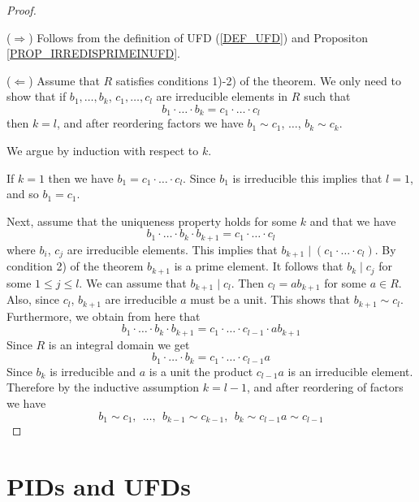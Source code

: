 \documentclass[12pt, letterpaper, oneside]{article}
\theoremstyle{plain}
\theoremstyle{definition}
\newcommand{\vs}{\vskip 5mm}
\begin{document}
\begin{proof}\ 


($\Rightarrow$) Follows from the definition of UFD (\ref{DEF_UFD}) and 
Propositon \ref{PROP_IRREDISPRIMEINUFD}.


\vs

 ($\Leftarrow$) Assume that $R$ satisfies conditions 1)-2) of the theorem. We only need 
 to show that  if $b_{1}, \dots, b_{k}$, $c_{1}, \dots, c_{l}$ are irreducible elements in $R$
 such that 
$$ b_{1}\cdot {\dots} \cdot b_{k} = c_{1}\cdot {\dots} \cdot c_{l}$$
then $k=l$, and after reordering factors   we have 
$b_{1}\sim c_{1}$, $\dots$, $b_{k}\sim c_{k}$.

We argue by induction with respect to $k$. 
 
If $k=1$ then we have  $b_{1}= c_{1}\cdot {\dots} \cdot c_{l}$. Since $b_{1}$ is irreducible 
this implies that $l=1$, and so $b_{1}=c_{1}$.


Next, assume that the uniqueness property holds for some $k$ and that we have 
$$ b_{1}\cdot {\dots} \cdot b_{k}\cdot b_{k+1} = c_{1}\cdot {\dots} \cdot c_{l}$$
where $b_{i}$, $c_{j}$ are irreducible elements. This implies that 
$b_{k+1} \mid (c_{1}\cdot {\dots} \cdot c_{l})$. By condition 2) of the theorem $b_{k+1}$ 
is a prime element. It follows that $b_{k}\mid c_{j}$ for some $1\leq j\leq l$. We can assume that 
$b_{k+1}\mid c_{l}$. Then $c_{l} = ab_{k+1}$ for some $a\in R$. Also, since $c_{l}$, $b_{k+1}$
are irreducible  $a$ must be a unit. This shows that $b_{k+1}\sim c_{l}$. Furthermore, we obtain
from here that 
$$ b_{1}\cdot {\dots} \cdot b_{k}\cdot b_{k+1} = c_{1}\cdot {\dots} \cdot c_{l-1}\cdot a b_{k+1}$$
Since $R$ is an integral domain we get  
$$ b_{1}\cdot {\dots} \cdot b_{k} = c_{1}\cdot {\dots} \cdot c_{l-1}a$$
Since $b_{k}$ is irreducible and $a$ is a unit the product $c_{l-1}a$ is an irreducible element. 
Therefore by the inductive assumption $k=l-1$, and after reordering of factors we 
have
$$b_{1}\sim c_{1}, \  \ \dots, \ \   b_{k-1}\sim c_{k-1}, \ \ b_{k}\sim c_{l-1}a \sim c_{l-1}$$
\end{proof}







\newpage
\section{PIDs and UFDs}
\label{SEC_PIDUFD}
\end{document}
